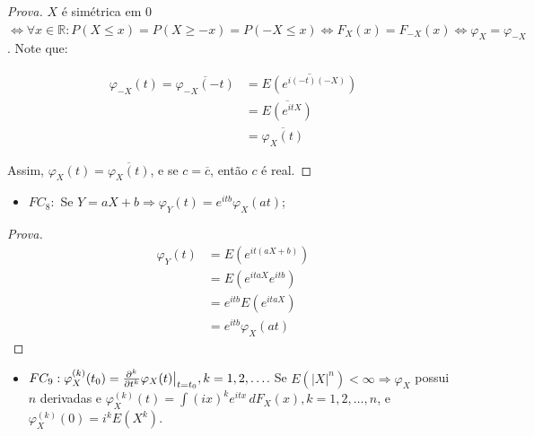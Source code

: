 \documentclass[
]{article}
\providecommand{\tightlist}{%
  \setlength{\itemsep}{0pt}\setlength{\parskip}{0pt}}
\theoremstyle{definition}
\theoremstyle{definition}
\theoremstyle{definition}
\theoremstyle{definition}
\theoremstyle{remark}
\begin{document}
\begin{proof}[Prova]
\(X\) é simétrica em 0 \(\Leftrightarrow \forall x \in \mathbb{R}:P(X \le x) = P(X \ge -x) = P(-X \le x) \Leftrightarrow F_{X}(x) = F_{-X}(x) \Leftrightarrow \varphi_{X} = \varphi_{-X}\). Note que:

\begin{align*}
\varphi_{-X}(t) = \overline{\varphi_{-X}(-t)} &= \overline{E(e^{i(-t)(-X)})} \\
&= \overline{E(e^{itX})} \\
&= \overline{\varphi_{X}(t)}
\end{align*}

Assim, \(\varphi_{X}(t) = \overline{\varphi_{X}(t)}\), e se \(c = \overline{c}\), então \(c\) é real.
\end{proof}

\begin{itemize}
\tightlist
\item
  \(FC_{8}:\) Se \(Y = aX + b \Rightarrow \varphi_{Y}(t) = e^{itb}\varphi_{X}(at)\);
\end{itemize}

\begin{proof}[Prova]
\begin{align*}
\varphi_{Y}(t) &= E(e^{it(aX + b)}) \\
&= E(e^{itaX}e^{itb}) \\
&= e^{itb}E(e^{itaX}) \\
&= e^{itb}\varphi_{X}(at)
\end{align*}
\end{proof}

\begin{itemize}
\tightlist
\item
  \(FC_{9}: \varphi_{X}^{(k)}(t_{0}) = \frac{\partial^{k}}{\partial t^{k}}\varphi_{X}(t)\big{|}_{t = t_{0}}, k = 1,2,\ldots\). Se \(E(|X|^{n}) < \infty \Rightarrow \varphi_{X}\) possui \(n\) derivadas e \(\varphi_{X}^{(k)}(t) = \int(ix)^{k}e^{itx}\, dF_{X}(x), k = 1,2,\ldots,n\), e \(\varphi_{X}^{(k)}(0) = i^{k}E(X^{k})\).
\end{itemize}
\end{document}
